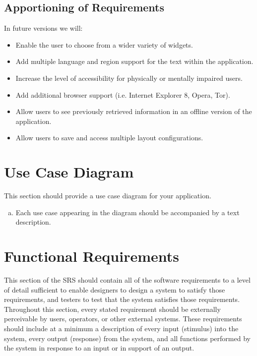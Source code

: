 \documentclass[]{article}
\begin{document}
\subsection{Apportioning of Requirements}
\label{sub:apportioning_of_requirements}
In future versions we will:  
\begin{itemize}
    \item Enable the user to choose from a wider variety of widgets.
    \item Add multiple language and region support for the text within the application.
    \item Increase the level of accessibility for physically or mentally impaired users.
    \item Add additional browser support (i.e. Internet Explorer 8, Opera, Tor).
    \item Allow users to see previously retrieved information in an offline version of the application.
    \item Allow users to save and access multiple layout configurations.
\end{itemize}


\section{Use Case Diagram}
\label{sec:use_case_diagram}
This section should provide a use case diagram for your application. 
\begin{enumerate}[a)]
  \item Each use case appearing in the diagram should be accompanied by a text description. 
\end{enumerate}

\section{Functional Requirements}
\label{sec:functional_requirements}
This section of the SRS should contain all of the software requirements to a level of detail sufficient to enable designers to design a system to satisfy those requirements, and testers to test that the system satisfies those requirements. Throughout this section, every stated requirement should be externally perceivable by users, operators, or other external systems. These requirements should include at a minimum a description of every input (stimulus) into the system, every output (response) from the system, and all functions performed by the system in response to an input or in support of an output.
\end{document}
